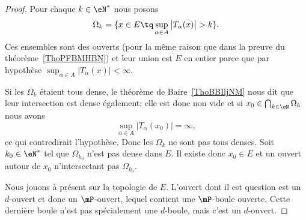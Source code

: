 \begin{proof}
    Pour chaque \( k\in \eN^*\) nous posons
    \begin{equation}
        \Omega_k=\{ x\in E\tq \sup_{\alpha\in A}\big| T_{\alpha}(x) \big|>k \}.
    \end{equation}
    Ces ensembles sont des ouverts (pour la même raison que dans la preuve du théorème~\ref{ThoPFBMHBN}) et leur union est \( E\) en entier parce que par hypothèse \( \sup_{\alpha\in A}\big| T_{\alpha}(x) \big|<\infty\).

    Si les \( \Omega_k\) étaient tous dense, le théorème de Baire~\ref{ThoBBIljNM} nous dit que leur intersection est dense également; elle est donc non vide et si \( x_0\in\bigcap_{k\in \eN}\Omega_k\) nous avons
    \begin{equation}
        \sup_{\alpha\in A}\big| T_{\alpha}(x_0) \big|=\infty,
    \end{equation}
    ce qui contredirait l'hypothèse. Donc les \( \Omega_k\) ne sont pas tous denses. Soit \( k_0\in \eN^*\) tel que \( \Omega_{k_0}\) n'est pas dense dans \( E\). Il existe donc \( x_0\in E\) et un ouvert autour de \( x_0\) n'intersectant pas \( \Omega_{k_0}\).

    Nous jouons à présent sur la topologie de \( E\). L'ouvert dont il est question est un \( d\)-ouvert et donc un \( \mP\)-ouvert, lequel contient une \( \mP\)-boule ouverte. Cette dernière boule n'est pas spécialement une \( d\)-boule, mais c'est un \( d\)-ouvert.


\end{proof}
